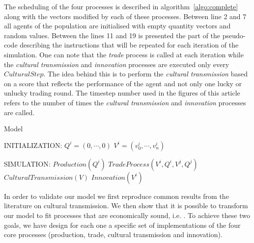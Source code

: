 \documentclass{wscpaperproc}
\begin{document}
The scheduling of the four processes is described in algorithm~\ref{algo:complete} along with the vectors modified by each of these processes. Between line 2 and 7 all agents of the population are initialised with empty quantity vectors and random values. Between the lines 11 and 19 is presented the part of the pseudo-code describing the instructions that will be repeated for each iteration of the simulation. One can note that the \emph{trade} process is called at each iteration while the \emph{cultural transmission} and \emph{innovation} processes are executed only every $CulturalStep$. The idea behind this is to perform the \emph{cultural transmission} based on a score that reflects the performance of the agent and not only one lucky or unlucky trading round. The timestep number used in the figures of this article refers to the number of times the \emph{cultural transmission} and \emph{innovation} processes are called.

\begin{algorithm}
\caption{Model}
\label{algo:complete}
	\begin{algorithmic}[1]
	\scriptsize
	\State INITIALIZATION: 
			 
				\State $Q^i = (0, \cdots, 0)$
				\State $V^i = (v^i_0, \cdots, v^i_n)$ 
			\EndFor
		\EndFor

	\State SIMULATION:
				\State $Production(Q^i)$
					\State $TradeProcess(V^i,Q^i,V^j,Q^j)$
				\EndFor				
					\State $CulturalTransmission(V)$
					\State $Innovation(V^i)$
				\EndIf
			\EndFor
		\EndLoop
\end{algorithmic}
\end{algorithm}


In order to validate our model we first reproduce common results from the literature on cultural transmission. We then show that it is possible to transform our model to fit processes that are economically sound, i.e. . To achieve these two goals, we have design for each one a specific set of implementations of the four core processes (production, trade, cultural transmission and innovation). 

\end{document}
